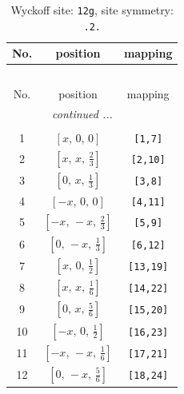 \documentclass[fleqn,8pt]{jsarticle}
\begin{document}
\begin{longtable}{ccc}
\caption{Wyckoff site: {\tt 12g}, site symmetry: {\tt .2.}}
 \\
 \hline \hline
No. & position & mapping \\ \hline \endfirsthead

\multicolumn{2}{l}{\tablename\ \thetable{}} \\
 \hline \hline
No. & position & mapping \\ \hline \endhead

 \hline \hline
\multicolumn{2}{r}{\footnotesize\it continued ...} \\ \endfoot

 \hline \hline
\multicolumn{2}{r}{} \\ \endlastfoot

1 & $\left[ x,\, 0,\, 0 \right]$ & {\tt [1,7]} \\ \hline
2 & $\left[ x,\, x,\, \frac{2}{3} \right]$ & {\tt [2,10]} \\ \hline
3 & $\left[ 0,\, x,\, \frac{1}{3} \right]$ & {\tt [3,8]} \\ \hline
4 & $\left[ - x,\, 0,\, 0 \right]$ & {\tt [4,11]} \\ \hline
5 & $\left[ - x,\, - x,\, \frac{2}{3} \right]$ & {\tt [5,9]} \\ \hline
6 & $\left[ 0,\, - x,\, \frac{1}{3} \right]$ & {\tt [6,12]} \\ \hline
7 & $\left[ x,\, 0,\, \frac{1}{2} \right]$ & {\tt [13,19]} \\ \hline
8 & $\left[ x,\, x,\, \frac{1}{6} \right]$ & {\tt [14,22]} \\ \hline
9 & $\left[ 0,\, x,\, \frac{5}{6} \right]$ & {\tt [15,20]} \\ \hline
10 & $\left[ - x,\, 0,\, \frac{1}{2} \right]$ & {\tt [16,23]} \\ \hline
11 & $\left[ - x,\, - x,\, \frac{1}{6} \right]$ & {\tt [17,21]} \\ \hline
12 & $\left[ 0,\, - x,\, \frac{5}{6} \right]$ & {\tt [18,24]} \\
\end{longtable}
\renewcommand{\arraystretch}{1.2}
\end{document}

